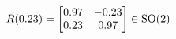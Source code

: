 \documentclass[preview]{standalone}
\begin{document}
\begin{align*}
\special{dvisvgm:raw <g id='unique000'>}R(0.23) = \begin{bmatrix} 0.97 & -0.23 \\ 0.23 & 0.97 \end{bmatrix} \in \text{SO}(2)\special{dvisvgm:raw </g>}
\end{align*}
\end{document}
